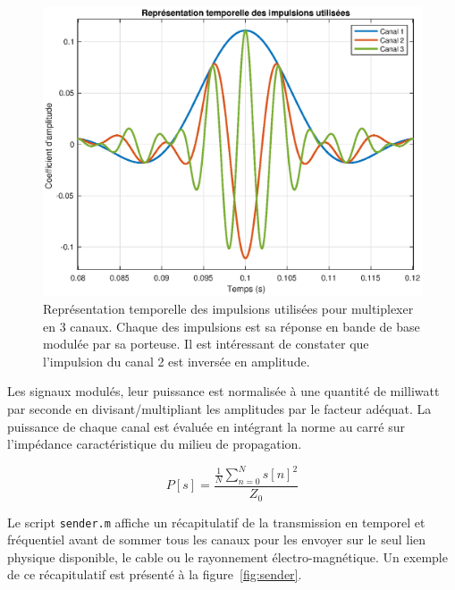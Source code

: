 \documentclass[10pt, oneside, a4paper]{article}
\begin{document}
\begin{figure}[htbp]
	\centering
	\includegraphics[height=0.4\textheight]{eps/impulse.eps}
	\caption{Représentation temporelle des impulsions utilisées pour multiplexer en 3 canaux.
			 Chaque des impulsions est sa réponse en bande de base modulée par sa porteuse.
			 Il est intéressant de constater que l'impulsion du canal 2 est inversée en
			 amplitude.}
	\label{fig:impulse}
\end{figure}

Les signaux modulés, leur puissance est normalisée à une quantité de milliwatt par seconde en divisant/multipliant les amplitudes par le facteur adéquat.
La puissance de chaque canal est évaluée en intégrant la norme au carré sur l'impédance caractéristique du milieu de propagation.

\begin{equation}
	P[s] = \frac{\frac{1}{N} \sum_{n = 0}^{N} s[n]^2}{Z_0}
\end{equation}

Le script \texttt{sender.m} affiche un récapitulatif de la transmission en temporel et fréquentiel avant de sommer tous les canaux pour les envoyer sur le seul lien physique disponible, le cable ou le rayonnement électro-magnétique.
Un exemple de ce récapitulatif est présenté à la figure~\ref{fig:sender}.
\end{document}

